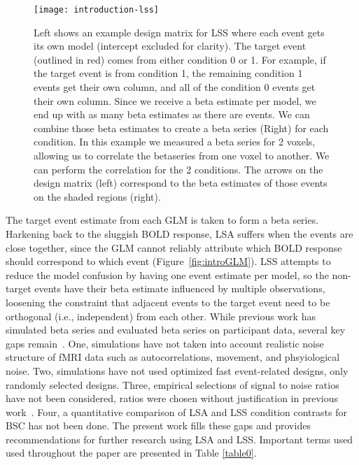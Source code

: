 \documentclass[phd,appendix,figures]{uithesis}
\begin{document}
\begin{figure}[H]
  \centering
  \texttt{[image: introduction-lss]}
  \caption{
    Left shows an example design matrix for LSS where each event gets its own model
    (intercept excluded for clarity).
    The target event (outlined in red) comes from either condition 0 or 1.
    For example, if the target event is from condition 1, the remaining condition 1 events
    get their own column, and all of the condition 0 events get their own column.
    Since we receive a beta estimate per model, we end up with as many beta estimates as there
    are events.
    We can combine those beta estimates to create a beta series (Right) for each condition.
    In this example we measured a beta series for 2 voxels, allowing us to
    correlate the betaseries from one voxel to another.
    We can perform the correlation for the 2 conditions.
    The arrows on the design matrix (left) correspond to the beta estimates of those events
    on the shaded regions (right).
  }
  \label{fig:introlss}
\end{figure}

The target event estimate from each GLM is taken to form a beta series.
Harkening back to the sluggish BOLD response, LSA suffers when the events are close together,
since the GLM cannot reliably attribute which BOLD response should correspond to which event (Figure~\ref{fig:introGLM}).
LSS attempts to reduce the model confusion by having one event estimate per model,
so the non-target events have their beta estimate influenced by multiple observations, loosening the
constraint that adjacent events to the target event need to be orthogonal (i.e., independent) from each other.
While previous work has simulated beta series and evaluated beta series on participant data,
several key gaps remain~\cite{Mumford2014a,Mumford2012,Turner2012a,Abdulrahman2016,Cisler2012,Arco2018}.
One, simulations have not taken into account realistic noise structure of fMRI data such as autocorrelations, movement, and phsyiological noise.
Two, simulations have not used optimized fast event-related designs, only randomly selected designs. 
Three, empirical selections of signal to noise ratios have not been considered,
ratios were chosen without justification in previous work~\cite{Abdulrahman2016,Mumford2012}.
Four, a quantitative comparison of LSA and LSS condition contrasts for BSC has not been done.
The present work fills these gaps and provides recommendations for further research
using LSA and LSS.
Important terms used used throughout the paper are presented in Table \ref{table0}.
\end{document}
